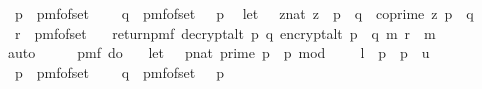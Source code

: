 \begin{isabellebody}
\ \ p\ {\isasymleftarrow}\ pmf{\isacharunderscore}{\kern0pt}of{\isacharunderscore}{\kern0pt}set\ {\isasymK}{\isacharsemicolon}{\kern0pt}\ \isanewline
\ \ q\ {\isasymleftarrow}\ pmf{\isacharunderscore}{\kern0pt}of{\isacharunderscore}{\kern0pt}set\ {\isacharparenleft}{\kern0pt}{\isasymK}\ {\isacharminus}{\kern0pt}\ {\isacharbraceleft}{\kern0pt}p{\isacharbraceright}{\kern0pt}{\isacharparenright}{\kern0pt}{\isacharsemicolon}{\kern0pt}\isanewline
\ \ let\ {\isasymZ}\ {\isacharequal}{\kern0pt}\ {\isacharbraceleft}{\kern0pt}{\isacharparenleft}{\kern0pt}z{\isacharcolon}{\kern0pt}{\isacharcolon}{\kern0pt}nat{\isacharparenright}{\kern0pt}{\isachardot}{\kern0pt}\ z\ {\isacharless}{\kern0pt}\ p\ {\isacharasterisk}{\kern0pt}\ q\ {\isasymand}\ coprime\ z\ {\isacharparenleft}{\kern0pt}p\ {\isacharasterisk}{\kern0pt}\ q{\isacharparenright}{\kern0pt}{\isacharbraceright}{\kern0pt}{\isacharsemicolon}{\kern0pt}\isanewline
\ \ r\ {\isasymleftarrow}\ pmf{\isacharunderscore}{\kern0pt}of{\isacharunderscore}{\kern0pt}set\ {\isasymZ}{\isacharsemicolon}{\kern0pt}\isanewline
\ \ return{\isacharunderscore}{\kern0pt}pmf\ {\isacharparenleft}{\kern0pt}decrypt{\isacharunderscore}{\kern0pt}alt\ p\ q\ {\isacharparenleft}{\kern0pt}encrypt{\isacharunderscore}{\kern0pt}alt\ {\isacharparenleft}{\kern0pt}p\ {\isacharasterisk}{\kern0pt}\ q{\isacharparenright}{\kern0pt}\ m\ r{\isacharparenright}{\kern0pt}\ {\isacharequal}{\kern0pt}\ m{\isacharparenright}{\kern0pt}{\isacharbraceright}{\kern0pt}{\isacharparenright}{\kern0pt}{\isachardoublequoteclose}\isanewline
\ \ \ \ \isamarkupfalse%
\ auto\isanewline
\isanewline
{}\isamarkupfalse%
\ \isamarkupfalse%
\ {\isachardoublequoteopen}\isanewline
\ \ pmf\ {\isacharparenleft}{\kern0pt}do\ {\isacharbraceleft}{\kern0pt}\isanewline
\ \ let\ {\isasymK}\ {\isacharequal}{\kern0pt}\ {\isacharbraceleft}{\kern0pt}{\isacharparenleft}{\kern0pt}p{\isacharcolon}{\kern0pt}{\isacharcolon}{\kern0pt}nat{\isacharparenright}{\kern0pt}{\isachardot}{\kern0pt}\ prime\ p\ {\isasymand}\ p\ mod\ {}\ {\isacharequal}{\kern0pt}\ {}\ {\isasymand}\ l\ {\isasymle}\ p\ {\isasymand}\ p\ {\isasymle}\ u{\isacharbraceright}{\kern0pt}{\isacharsemicolon}{\kern0pt}\isanewline
\ \ p\ {\isasymleftarrow}\ pmf{\isacharunderscore}{\kern0pt}of{\isacharunderscore}{\kern0pt}set\ {\isasymK}{\isacharsemicolon}{\kern0pt}\ \isanewline
\ \ q\ {\isasymleftarrow}\ pmf{\isacharunderscore}{\kern0pt}of{\isacharunderscore}{\kern0pt}set\ {\isacharparenleft}{\kern0pt}{\isasymK}\ {\isacharminus}{\kern0pt}\ {\isacharbraceleft}{\kern0pt}p{\isacharbraceright}{\kern0pt}{\isacharparenright}{\kern0pt}{\isacharsemicolon}{\kern0pt}\isanewline

\end{isabellebody}
